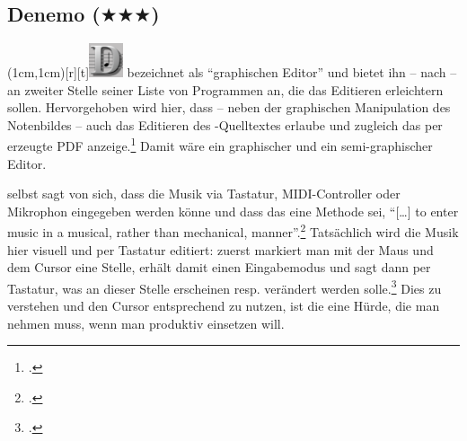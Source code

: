 %
%
%



\subsection{Denemo ($\bigstar\bigstar\bigstar$)}

\parpic(1cm,1cm)[r][t]{\includegraphics[width=1cm]{logos/denemo-300dpi.png}}
\label{Denemo} bezeichnet  als \enquote{graphischen
Editor} und bietet ihn -- nach  -- an zweiter Stelle seiner
Liste von Programmen an, die das Editieren erleichtern sollen. Hervorgehoben
wird hier, dass  -- neben der graphischen Manipulation des
Notenbildes -- auch das Editieren des -Quelltextes erlaube und
zugleich das per  erzeugte PDF anzeige.\footcite[vgl.][\nopage
wp.]{LilyPond2018g} Damit wäre  ein graphischer und ein
semi-graphischer Editor.

 selbst sagt von sich, dass die Musik via Tastatur, MIDI-Controller
oder Mikrophon eingegeben werden könne und dass das eine Methode sei,
\enquote{[\ldots] to enter music in a musical, rather than mechanical,
manner}.\footcite[vgl.][\nopage wp.]{Denemo2019b} Tatsächlich wird die Musik hier
visuell und per Tastatur editiert: zuerst markiert man mit der Maus und dem
Cursor eine Stelle, erhält damit einen Eingabemodus und sagt dann per Tastatur,
was an dieser Stelle erscheinen resp. verändert werden solle.\footcite[vgl.][1,
5, u. 47ff]{Shann2015b} Dies zu verstehen und den Cursor entsprechend zu nutzen,
ist die eine Hürde, die man nehmen muss, wenn man  produktiv
einsetzen will.

